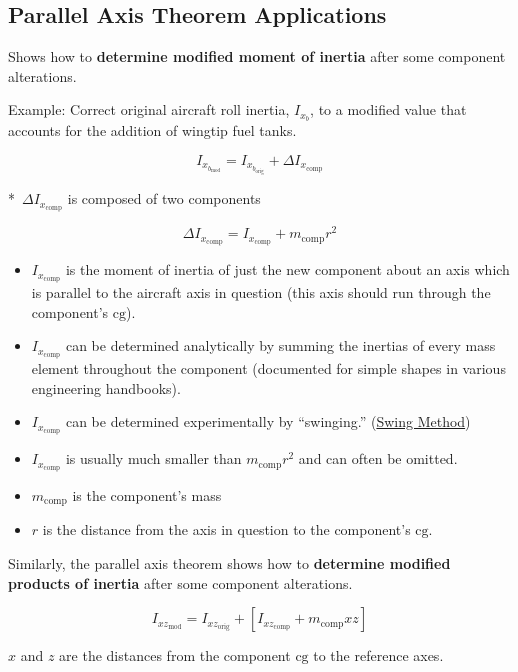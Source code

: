 \documentclass[
]{book}
\providecommand{\tightlist}{%
  \setlength{\itemsep}{0pt}\setlength{\parskip}{0pt}}
\begin{document}
\hypertarget{parallel-axis-theorem-applications}{%
\subsection{Parallel Axis Theorem Applications}\label{parallel-axis-theorem-applications}}

Shows how to \textbf{determine modified moment of inertia} after some component alterations.

Example: Correct original aircraft roll inertia, \(I_{x_b}\), to a modified value that accounts for the addition of wingtip fuel tanks.

\[ I_{x_{b_{\text{mod}}}} = I_{x_{b_{\text{orig}}}} + \Delta I_{x_{\text{comp}}} \]

*~\(\Delta I_{x_{\text{comp}}}\) is composed of two components

\[ \Delta I_{x_{\text{comp}}} = I_{x_{\text{comp}}} + m_{\text{comp}} r^2 \]

\begin{itemize}
\tightlist
\item
  \(I_{x_{\text{comp}}}\) is the moment of inertia of just the new component about an axis which is parallel to the aircraft axis in question (this axis should run through the component's \(\mathrm{cg}\)).
\item
  \(I_{x_{\text{comp}}}\) can be determined analytically by summing the inertias of every mass element throughout the component (documented for simple shapes in various engineering handbooks).
\item
  \(I_{x_{\text{comp}}}\) can be determined experimentally by ``swinging.'' (\protect\hyperlink{swing-method}{Swing Method})
\item
  \(I_{x_{\text{comp}}}\) is usually much smaller than \(m_{\text{comp}} r^2\) and can often be omitted.
\item
  \(m_{\text{comp}}\) is the component's mass
\item
  \(r\) is the distance from the axis in question to the component's \(\mathrm{cg}\).
\end{itemize}

Similarly, the parallel axis theorem shows how to \textbf{determine modified products of inertia} after some component alterations.

\[ I_{xz_{\text{mod}}} = I_{xz_{\text{orig}}} + \left[ I_{xz_{\text{comp}}} + m_{\text{comp}} xz \right] \]

\(x\) and \(z\) are the distances from the component \(\mathrm{cg}\) to the reference axes.
\end{document}
